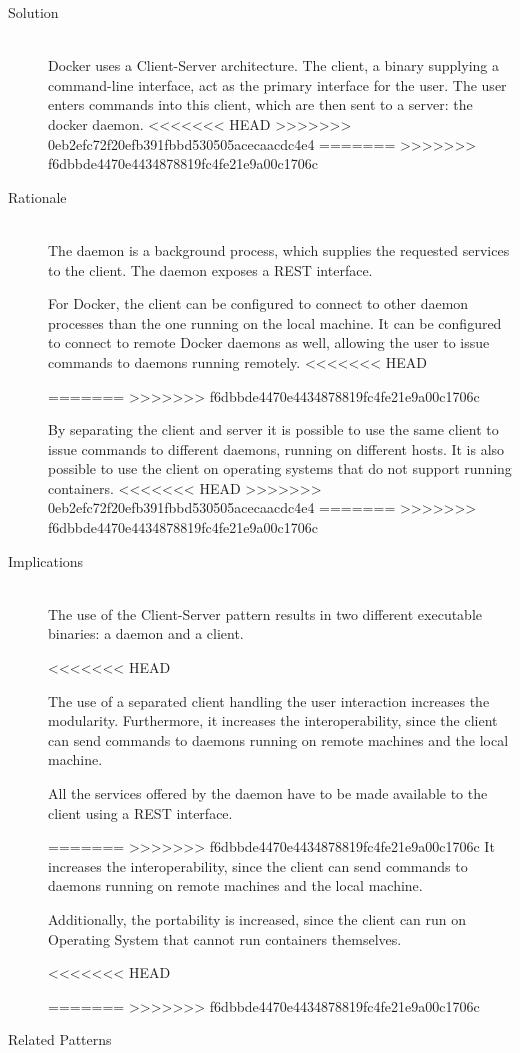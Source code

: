 \begin{description}
\item [Solution]~\\
Docker uses a Client-Server architecture. The client, a binary supplying a command-line interface, act as the primary interface for the user. The user enters commands into this client, which are then sent to a server: the docker daemon. 
<<<<<<< HEAD
>>>>>>> 0eb2efc72f20efb391fbbd530505acecaacdc4e4
=======
>>>>>>> f6dbbde4470e4434878819fc4fe21e9a00c1706c

\item [Rationale] ~\\
The daemon is a background process, which supplies the requested services to the client. The daemon exposes a REST interface.

For Docker, the client can be configured to connect to other daemon processes than the one running on the local machine. It can be configured to connect to remote Docker daemons as well, allowing the user to issue commands to daemons running remotely.
<<<<<<< HEAD

=======
>>>>>>> f6dbbde4470e4434878819fc4fe21e9a00c1706c

By separating the client and server it is possible to use the same client to issue commands to different daemons, running on different hosts.
It is also possible to use the client on operating systems that do not support running containers.
<<<<<<< HEAD
>>>>>>> 0eb2efc72f20efb391fbbd530505acecaacdc4e4
=======
>>>>>>> f6dbbde4470e4434878819fc4fe21e9a00c1706c

\item [Implications]~\\
The use of the Client-Server pattern results in two different executable binaries: a daemon and a client. 

<<<<<<< HEAD

The use of a separated client handling the user interaction increases the modularity.
Furthermore, it increases the interoperability, since the client can send commands to daemons running on remote machines and the local machine.

All the services offered by the daemon have to be made available to the client using a REST interface.

=======
>>>>>>> f6dbbde4470e4434878819fc4fe21e9a00c1706c
It increases the interoperability, since the client can send commands to daemons running on remote machines and the local machine.

Additionally, the portability is increased, since the client can run on Operating System that cannot run containers themselves.


<<<<<<< HEAD

=======
>>>>>>> f6dbbde4470e4434878819fc4fe21e9a00c1706c
\item [Related Patterns]~\\


\end{description}


